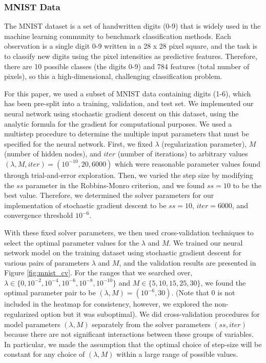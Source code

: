 \subsubsection{MNIST Data}

The MNIST dataset is a set of handwritten digits (0-9) that is widely used in the machine learning community to benchmark classification methods.  Each observation is a single digit 0-9 written in a 28 x 28 pixel square, and the task is to classify new digits using the pixel intensities as predictive features.  Therefore, there are 10 possible classes (the digits 0-9) and 784 features (total number of pixels), so this a high-dimensional, challenging classification problem.  

For this paper, we used a subset of MNIST data containing digits (1-6), which has been pre-split into a training, validation, and test set.  We implemented our neural network using stochastic gradient descent on this dataset, using the analytic formula for the gradient for computational purposes. We used a multistep procedure to determine the multiple input parameters that must be specified for the neural network.  First, we fixed $\lambda$ (regularization parameter),  $M$ (number of hidden nodes), and $iter$ (number of iterations) to arbitrary values $(\lambda, M, iter) = (10^{-10}, 20, 6000)$ which were reasonable parameter values found through trial-and-error exploration.  Then, we varied the step size by modifying the $ss$ parameter in the Robbins-Monro criterion, and we found $ss = 10$ to be the best value.  Therefore, we determined the solver parameters for our implementation of stochastic gradient descent to be $ss = 10$, $iter = 6000$, and convergence threshold $10^{-6}$.  

With these fixed solver parameters, we then used cross-validation techniques to select the optimal parameter values for the $\lambda$ and $M$. We trained our neural network model on the training dataset using stochastic gradient descent for various pairs of parameters $\lambda$ and $M$, and the validation results are presented in Figure \ref{fig:mnist_cv}.  For the ranges that we searched over, $\lambda \in \{0, 10^{-2}, 10^{-4}, 10^{-6}, 10^{-8}, 10^{-10}\}$ and $M \in \{5, 10, 15, 25, 30\}$, we found the optimal parameter pair to be $(\lambda, M) = (10^{-6}, 30)$.  (Note that 0 is not included in the heatmap for consistency, however, we explored the non-regularized option but it was suboptimal).  We did cross-validation procedures for model parameters $(\lambda, M)$ separately from the solver parameters $(ss, iter)$ because there are not significant interactions between these groups of variables.  In particular, we made the assumption that the optimal choice of step-size will be constant for any choice of $(\lambda, M)$ within a large range of possible values.  

